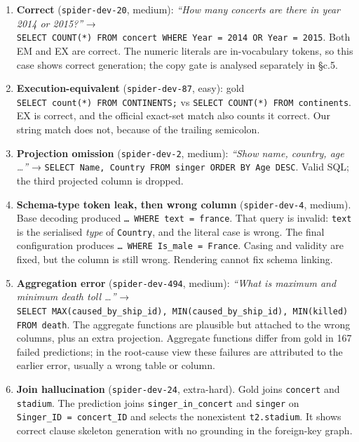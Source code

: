 \documentclass[
  10pt,
]{article}
\newcounter{none} %
\providecommand{\tightlist}{%
  \setlength{\itemsep}{0pt}\setlength{\parskip}{0pt}}
\begin{document}
\begin{enumerate}
\def\labelenumi{\arabic{enumi}.}
\tightlist
\item
  \textbf{Correct} (\texttt{spider-dev-20}, medium): \emph{``How many
  concerts are there in year 2014 or 2015?''} →
  \texttt{SELECT\ COUNT(*)\ FROM\ concert\ WHERE\ Year\ =\ 2014\ OR\ Year\ =\ 2015}.
  Both EM and EX are correct. The numeric literals are in-vocabulary
  tokens, so this case shows correct generation; the copy gate is
  analysed separately in §c.5.
\item
  \textbf{Execution-equivalent} (\texttt{spider-dev-87}, easy): gold
  \texttt{SELECT\ count(*)\ FROM\ CONTINENTS;} vs
  \texttt{SELECT\ COUNT(*)\ FROM\ continents}. EX is correct, and the
  official exact-set match also counts it correct. Our string match does
  not, because of the trailing semicolon.
\item
  \textbf{Projection omission} (\texttt{spider-dev-2}, medium):
  \emph{``Show name, country, age \ldots{}''} →
  \texttt{SELECT\ Name,\ Country\ FROM\ singer\ ORDER\ BY\ Age\ DESC}.
  Valid SQL; the third projected column is dropped.
\item
  \textbf{Schema-type token leak, then wrong column}
  (\texttt{spider-dev-4}, medium). Base decoding produced
  \texttt{…\ WHERE\ text\ =\ \textquotesingle{}france\textquotesingle{}}.
  That query is invalid: \texttt{text} is the serialised \emph{type} of
  \texttt{Country}, and the literal case is wrong. The final
  configuration produces
  \texttt{…\ WHERE\ Is\_male\ =\ \textquotesingle{}France\textquotesingle{}}.
  Casing and validity are fixed, but the column is still wrong.
  Rendering cannot fix schema linking.
\item
  \textbf{Aggregation error} (\texttt{spider-dev-494}, medium):
  \emph{``What is maximum and minimum death toll \ldots{}''} →
  \texttt{SELECT\ MAX(caused\_by\_ship\_id),\ MIN(caused\_by\_ship\_id),\ MIN(killed)\ FROM\ death}.
  The aggregate functions are plausible but attached to the wrong
  columns, plus an extra projection. Aggregate functions differ from
  gold in 167 failed predictions; in the root-cause view these failures
  are attributed to the earlier error, usually a wrong table or column.
\item
  \textbf{Join hallucination} (\texttt{spider-dev-24}, extra-hard). Gold
  joins \texttt{concert} and \texttt{stadium}. The prediction joins
  \texttt{singer\_in\_concert} and \texttt{singer} on
  \texttt{Singer\_ID\ =\ concert\_ID} and selects the nonexistent
  \texttt{t2.stadium}. It shows correct clause skeleton generation with
  no grounding in the foreign-key graph.
\end{enumerate}
\end{document}
